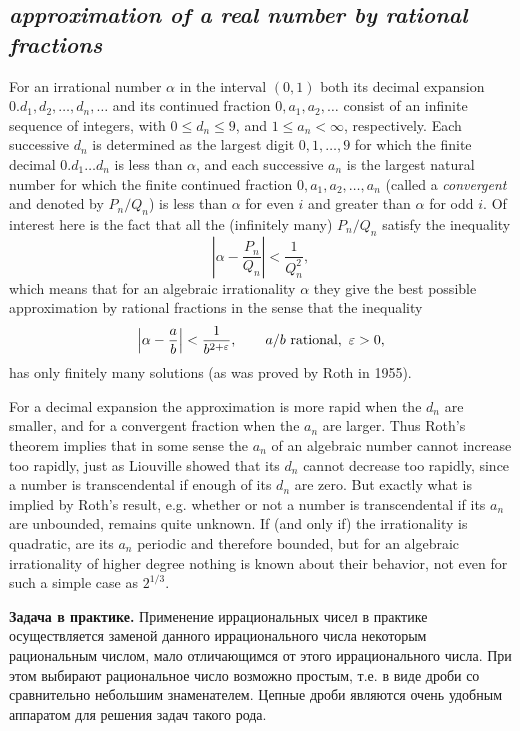 
\subsection*{ \textit{approximation of a real number by rational fractions}}
\begin{sourcebox}
For an irrational number $\alpha$ in the interval $(0,1)$ both its decimal expansion $0.d_1,d_2,\ldots,d_n,\ldots$ and its continued fraction $0,a_1,a_2,\ldots$ consist of an infinite sequence of integers, with $0\le d_n\le9$, and $1\le a_n<\infty$, respectively. Each successive $d_n$ is determined as the largest digit $0,1,\ldots,9$ for which the finite decimal $0.d_1\ldots d_n$ is less than $\alpha$, and each successive $a_n$ is the largest natural number for which the finite continued fraction $0,a_1,a_2,\ldots,a_n$ (called a \emph{convergent} and denoted by $P_n/Q_n$) is less than $\alpha$ for even $i$ and greater than $\alpha$ for odd $i$. Of interest here is the fact that all the (infinitely many) $P_n/Q_n$ satisfy the inequality
\[
\left|\alpha-\frac{P_n}{Q_n}\right|<\frac1{Q_n^2},
\]
which means that for an algebraic irrationality $\alpha$ they give the best possible approximation by rational fractions in the sense that the inequality
\[
\left|\alpha-\frac ab\right|<\frac1{b^{2+\varepsilon}},\qquad a/b\ \hbox{rational},\ \varepsilon>0,
\]
has only finitely many solutions (as was proved by Roth in 1955).

For a decimal expansion the approximation is more rapid when the $d_n$ are smaller, and for a convergent fraction when the $a_n$ are larger. Thus Roth's theorem implies that in some sense the $a_n$ of an algebraic number cannot increase too rapidly, just as Liouville showed that its $d_n$ cannot decrease too rapidly, since a number is transcendental if enough of its $d_n$ are zero. But exactly what is implied by Roth's result, e.g. whether or not a number is transcendental if its $a_n$ are unbounded, remains quite unknown. If (and only if) the irrationality is quadratic, are its $a_n$ periodic and therefore bounded, but for an algebraic irrationality of higher degree nothing is known about their behavior, not even for such a simple case as $2^{1/3}$.
\end{sourcebox}

\begin{rusblock}
\textbf{Задача в практике.} Применение иррациональных чисел в практике осуществляется заменой данного иррационального числа некоторым рациональным числом, мало отличающимся от этого иррационального числа. При этом выбирают рациональное число возможно простым, т.е. в виде дроби со сравнительно небольшим знаменателем. Цепные дроби являются очень удобным аппаратом для решения задач такого рода.
\end{rusblock}

